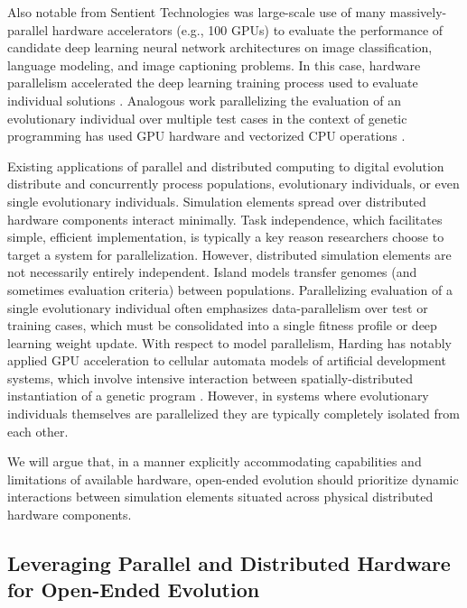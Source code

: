 Also notable from Sentient Technologies was large-scale use of many massively-parallel hardware accelerators (e.g., 100 GPUs) to evaluate the performance of candidate deep learning neural network architectures on image classification, language modeling, and image captioning problems.
In this case, hardware parallelism accelerated the deep learning training process used to evaluate individual solutions \citep{miikkulainen2019evolving}.
Analogous work parallelizing the evaluation of an evolutionary individual over multiple test cases in the context of genetic programming has used GPU hardware and vectorized CPU operations \citep{harding2007fast2, langdon2019continuous}.


Existing applications of parallel and distributed computing to digital evolution distribute and concurrently process populations, evolutionary individuals, or even single evolutionary individuals.
Simulation elements spread over distributed hardware components interact minimally.
Task independence, which facilitates simple, efficient implementation, is typically a key reason researchers choose to target a system for parallelization. %
However, distributed simulation elements are not necessarily entirely independent.
Island models transfer genomes (and sometimes evaluation criteria) between populations.
Parallelizing evaluation of a single evolutionary individual often emphasizes data-parallelism over test or training cases, which must be consolidated into a single fitness profile or deep learning weight update. %
With respect to model parallelism, Harding has notably applied GPU acceleration to cellular automata models of artificial development systems, which involve intensive interaction between spatially-distributed instantiation of a genetic program  \citep{harding2007fast}.
However, in systems where evolutionary individuals themselves are parallelized they are typically completely isolated from each other.

We will argue that, in a manner explicitly accommodating capabilities and limitations of available hardware, open-ended evolution should prioritize dynamic interactions between simulation elements situated across physical distributed hardware components.

\subsection{Leveraging Parallel and Distributed Hardware for Open-Ended Evolution}

